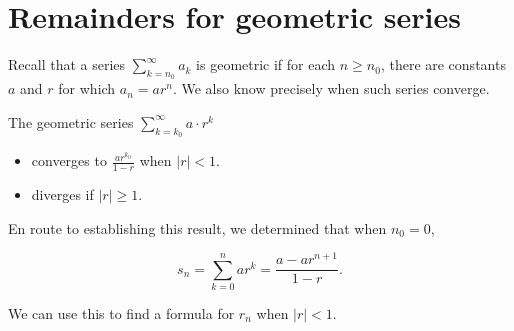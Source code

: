 \documentclass{ximera}
\begin{document}
   

\section{Remainders for geometric series}
Recall that a series $\sum_{k=n_0}^{\infty} a_k$ is geometric if for each $n\geq n_0$, there are constants $a$ and $r$ for which $a_n = ar^n$.  We also know precisely when such series converge.

\begin{theorem}
  The geometric series $\sum_{k= k_0}^\infty a \cdot r^k$ 
  
  \begin{itemize} 
  \item converges to $\frac{ar^{k_0}}{1-r}$ when $|r| < 1$.
  \item diverges if $|r| \geq 1$.  
  \end{itemize}
  \end{theorem}
  
En route to establishing this result, we determined that when $n_0=0$,

\[
s_n = \sum_{k=0}^n ar^k = \frac{a-ar^{n+1}}{1-r}.
\]  

We can use this to find a formula for $r_n$ when $|r|<1$.
\end{document}
